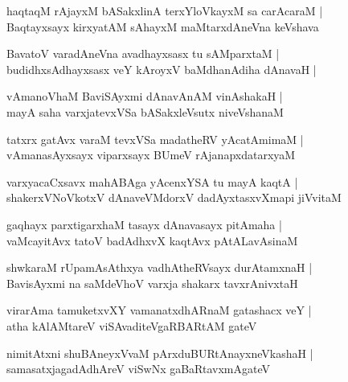 \begin{shloka}
haqtaqM rAjayxM bASakxlinA terxYloVkayxM sa carAcaraM |\\
Baqtayxsayx kirxyatAM sAhayxM maMtarxdAneVna keVshava
\end{shloka}

\begin{shloka}
BavatoV varadAneVna avadhayxsasx tu sAMparxtaM |\\
budidhxsAdhayxsasx veY kAroyxV baMdhanAdiha dAnavaH |
\end{shloka}

\begin{shloka}
vAmanoVhaM BaviSAyxmi dAnavAnAM vinAshakaH |\\
mayA saha varxjatevxVSa bASakxleVsutx niveVshanaM 
\end{shloka}

\begin{shloka}
tatxrx gatAvx varaM tevxVSa madatheRV yAcatAmimaM |\\
vAmanasAyxsayx viparxsayx BUmeV rAjanapxdatarxyaM 
\end{shloka}

\begin{shloka}
varxyacaCxsavx mahABAga yAcenxYSA tu mayA kaqtA |\\
shakerxVNoVkotxV dAnaveVMdorxV dadAyxtasxvXmapi jiVvitaM
\end{shloka}

\begin{shloka}
gaqhayx parxtigarxhaM tasayx dAnavasayx pitAmaha |\\
vaMcayitAvx tatoV badAdhxvX kaqtAvx pAtALavAsinaM 
\end{shloka}

\begin{shloka}
shwkaraM rUpamAsAthxya vadhAtheRVsayx durAtamxnaH |\\
BavisAyxmi na saMdeVhoV varxja shakarx tavxrAnivxtaH
\end{shloka}

\begin{shloka}
virarAma tamuketxvXY vamanatxdhARnaM gatashacx veY |\\
atha kAlAMtareV viSAvaditeVgaRBARtAM gateV
\end{shloka}

\begin{shloka}
nimitAtxni shuBAneyxVvaM pArxduBURtAnayxneVkashaH |\\
samasatxjagadAdhAreV viSwNx gaBaRtavxmAgateV
\end{shloka}


